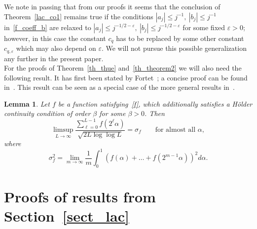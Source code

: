 \documentclass[12pt]{amsart}
\newtheorem{lemma}{Lemma}
\newcommand {\ve} {\varepsilon}
\begin{document}
We note in passing that from our proofs it seems that the conclusion of Theorem~\ref{lac_co1} remains true if the conditions $|a_j| \leq j^{-1}, ~|b_j| \leq j^{-1}$ in~\eqref{f_coeff_b} are relaxed to $|a_j| \leq j^{-1/2-\ve},~|b_j| \leq j^{-1/2-\ve}$ for some fixed $\ve > 0$; however, in this case the constant $c_q$ has to be replaced by some other constant $c_{q,\ve}$ which may also depend on $\ve$. We will not pursue this possible generalization any further in the present paper.\\

For the proofs of Theorem~\ref{th_thue} and~\ref{th_theorem2} we will also need the following result. It has first been stated by Fortet~\cite{fortet}; a concise proof can be found in~\cite{maruyama}. This result can be seen as a special case of the more general results in~\cite{aist2}. %

\begin{lemma} \label{lac_lemma4}
Let $f$ be a function satisfying~\eqref{f}, which additionally satisfies a H\"older continuity condition of order $\beta$ for some $\beta>0$. Then
$$
\limsup_{L \to \infty} \frac{\sum_{\ell=0}^{L-1} f(2^\ell \alpha)}{\sqrt{2 L \log \log L}} = \sigma_f \qquad \textrm{for almost all $\alpha$},
$$
where 
\begin{equation} \label{sigmap}
\sigma_f^2 = \lim_{m \to \infty} \frac{1}{m} \int_0^1 \left(f(\alpha) + \dots + f(2^{m-1} \alpha)\right)^2 d\alpha.
\end{equation}
\end{lemma}



\section{Proofs of results from Section~\ref{sect_lac}} \label{sect_lac2}
\end{document}

